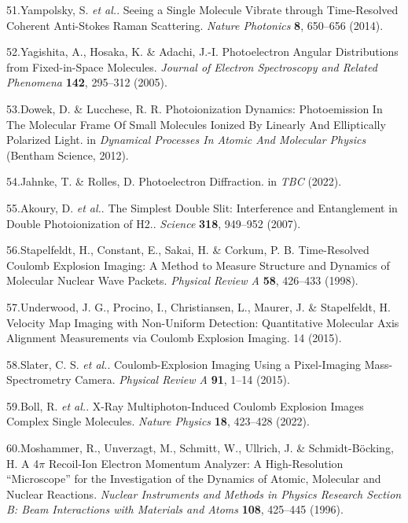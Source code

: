\documentclass[10pt]{article}
\begin{document}
\label{csl:51}51.Yampolsky, S. \textit{et al.}. {Seeing a Single Molecule Vibrate through Time-Resolved Coherent Anti-{{Stokes Raman}} Scattering}. \textit{Nature Photonics} \textbf{8}, 650–656 (2014).

\label{csl:52}52.Yagishita, A., Hosaka, K. \& Adachi, J.-I. {Photoelectron Angular Distributions from Fixed-in-Space Molecules}. \textit{Journal of Electron Spectroscopy and Related Phenomena} \textbf{142}, 295–312 (2005).

\label{csl:53}53.Dowek, D. \& Lucchese, R. R. {Photoionization {{Dynamics}}: {{Photoemission In The Molecular Frame Of Small Molecules Ionized By Linearly And Elliptically Polarized Light}}}. in \textit{Dynamical {{Processes In Atomic And Molecular Physics}}} ({Bentham Science}, 2012).

\label{csl:54}54.Jahnke, T. \& Rolles, D. {Photoelectron {{Diffraction}}}. in \textit{{{TBC}}} (2022).

\label{csl:55}55.Akoury, D. \textit{et al.}. {The Simplest Double Slit: Interference and Entanglement in Double Photoionization of {{H2}}.}. \textit{Science} \textbf{318}, 949–952 (2007).

\label{csl:56}56.Stapelfeldt, H., Constant, E., Sakai, H. \& Corkum, P. B. {Time-Resolved {{Coulomb}} Explosion Imaging: {{A}} Method to Measure Structure and Dynamics of Molecular Nuclear Wave Packets}. \textit{Physical Review A} \textbf{58}, 426–433 (1998).

\label{csl:57}57.Underwood, J. G., Procino, I., Christiansen, L., Maurer, J. \& Stapelfeldt, H. {Velocity Map Imaging with Non-Uniform Detection: Quantitative Molecular Axis Alignment Measurements via {{Coulomb}} Explosion Imaging}. 14 (2015).

\label{csl:58}58.Slater, C. S. \textit{et al.}. {Coulomb-Explosion Imaging Using a Pixel-Imaging Mass-Spectrometry Camera}. \textit{Physical Review A} \textbf{91}, 1–14 (2015).

\label{csl:59}59.Boll, R. \textit{et al.}. {X-Ray Multiphoton-Induced {{Coulomb}} Explosion Images Complex Single Molecules}. \textit{Nature Physics} \textbf{18}, 423–428 (2022).

\label{csl:60}60.Moshammer, R., Unverzagt, M., Schmitt, W., Ullrich, J. \& {Schmidt-B{\"o}cking}, H. {A 4{$\pi$} Recoil-Ion Electron Momentum Analyzer: A High-Resolution ``Microscope'' for the Investigation of the Dynamics of Atomic, Molecular and Nuclear Reactions}. \textit{Nuclear Instruments and Methods in Physics Research Section B: Beam Interactions with Materials and Atoms} \textbf{108}, 425–445 (1996).
\end{document}
